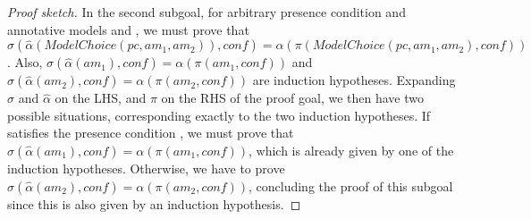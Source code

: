 \begin{proof}[Proof sketch]
 In the second subgoal, for arbitrary presence condition  and annotative models  and , we must prove that 
 $\mathit{\sigma(\hat\alpha(ModelChoice(pc, am_1, am_2)), conf)} = \mathit{\alpha(\pi(ModelChoice(pc, am_1, am_2), conf))}$.
 Also, $\mathit{\sigma(\hat\alpha(am_1), conf)} = \mathit{\alpha(\pi(am_1, conf))}$
 and 
 $\mathit{\sigma(\hat\alpha(am_2), conf)} = \mathit{\alpha(\pi(am_2, conf))}$ are induction hypotheses.
 Expanding $\sigma$ and $\hat\alpha$ on the LHS, and $\pi$ on the RHS of the proof goal, we then have two possible situations, corresponding exactly to the two induction hypotheses.
 If  satisfies the presence condition , we must prove that
 $\mathit{\sigma(\hat\alpha(am_1), conf)} = \mathit{\alpha(\pi(am_1, conf))}$, 
 which is already given by one of the induction hypotheses.
 Otherwise, we have to prove 
 $\mathit{\sigma(\hat\alpha(am_2), conf)} = \mathit{\alpha(\pi(am_2, conf))}$, 
 concluding the proof of this subgoal since this is also given by an induction hypothesis.
\end{proof}
 

